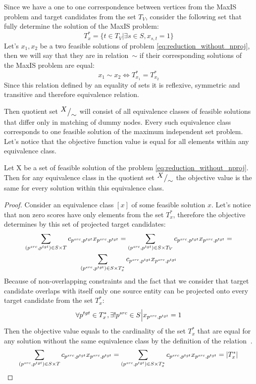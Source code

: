 Since we have a one to one correspondence between vertices from the MaxIS problem and target
candidates from the set \( T_V \), consider the following set that fully determine the solution of the
MaxIS problem:
\[
  T^*_{x} = \{ t \in T_V | \exists s \in S, x_{s, t} = 1 \}
\]
Let's \( x_1, x_2 \) be a two feasible solutions of problem \eqref{eq:reduction_without_nproj}, then we will say that
they are in relation~\( \sim \) if their corresponding solutions of the MaxIS problem are equal:
\[
  x_1 \sim x_2 \Leftrightarrow T^{*}_{x_1} = T^{*}_{x_2}
\]
Since this relation defined by an equality of sets it is reflexive, symmetric and transitive and therefore
equivalence relation.

Then quotient set \( {^{\textstyle X}\big/_{\textstyle \sim}} \) will consist of all equivalence classes of feasible solutions
that differ only in matching of dummy nodes. Every such equivalence class corresponds to one feasible solution of
the maximum independent set problem. Let's notice that the objective function value is equal for all
elements within any equivalence class.
\begin{lemma}
  Let X be a set of feasible solution of the problem \eqref{eq:reduction_without_nproj}. Then
  for any equivalence class in the quotient set \( {^{\textstyle X}\big/_{\textstyle \sim}} \) the objective
  value is the same for every solution within this equivalence class.
\end{lemma}
\begin{proof}
  Consider an equivalence class \( [x] \) of some feasible solution \( x \).
  Let's notice that non zero scores have only elements from the set \( T^*_x \),
  therefore the objective determines by this set of projected target candidates:
  \begin{multline*}
    \sum\limits_{(p^{src}, p^{tgt}) \in S \times T} c_{p^{src}, p^{tgt}} x_{p^{src}, p^{tgt}} =
    \sum\limits_{(p^{src}, p^{tgt}) \in S \times T_V} c_{p^{src}, p^{tgt}} x_{p^{src}, p^{tgt}} = \\
    \sum\limits_{(p^{src}, p^{tgt}) \in S \times T^{*}_{x}} c_{p^{src}, p^{tgt}} x_{p^{src}, p^{tgt}}
  \end{multline*}
  Because of non-overlapping constraints and the fact that we consider that target candidate overlaps with
  itself only one source entity can be projected onto every target candidate from the set \( T_x^* \):
  \[
    \forall p^{tgt} \in T^*_x, \exists! p^{src} \in S \Big| x_{p^{src}, p^{tgt}} = 1
  \]
  Then the objective value equals to the cardinality of the set \( T^*_x \) that are equal for
  any solution without the same equivalence class by the definition of the relation \( ~ \).
  \[
    \sum\limits_{(p^{src}, p^{tgt}) \in S \times T} c_{p^{src}, p^{tgt}} x_{p^{src}, p^{tgt}} =
    \sum\limits_{(p^{src}, p^{tgt}) \in S \times T^{*}_{x}} c_{p^{src}, p^{tgt}} x_{p^{src}, p^{tgt}} =
    |T_x^*|
  \]
\end{proof}
